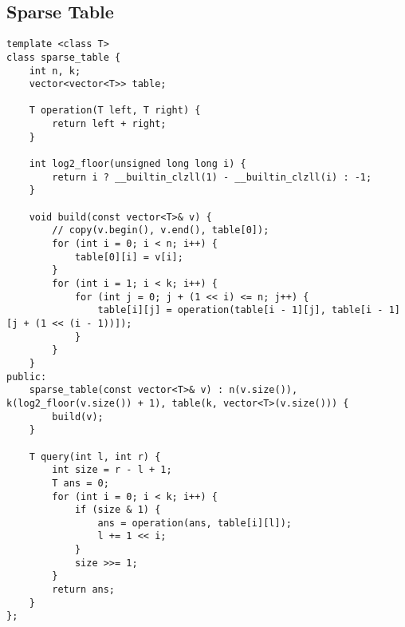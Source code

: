 \subsection{Sparse Table}
\begin{lstlisting}
template <class T>
class sparse_table {
    int n, k;
    vector<vector<T>> table;

    T operation(T left, T right) {
        return left + right;
    }
    
    int log2_floor(unsigned long long i) {
        return i ? __builtin_clzll(1) - __builtin_clzll(i) : -1;
    }
    
    void build(const vector<T>& v) {
        // copy(v.begin(), v.end(), table[0]);
        for (int i = 0; i < n; i++) {
            table[0][i] = v[i];
        }
        for (int i = 1; i < k; i++) {
            for (int j = 0; j + (1 << i) <= n; j++) {
                table[i][j] = operation(table[i - 1][j], table[i - 1][j + (1 << (i - 1))]);
            }      
        }
    }
public:
    sparse_table(const vector<T>& v) : n(v.size()), k(log2_floor(v.size()) + 1), table(k, vector<T>(v.size())) {
        build(v);
    }

    T query(int l, int r) {
        int size = r - l + 1;
        T ans = 0;
        for (int i = 0; i < k; i++) {
            if (size & 1) {
                ans = operation(ans, table[i][l]);
                l += 1 << i;
            }
            size >>= 1;
        }
        return ans;
    }
};
\end{lstlisting}